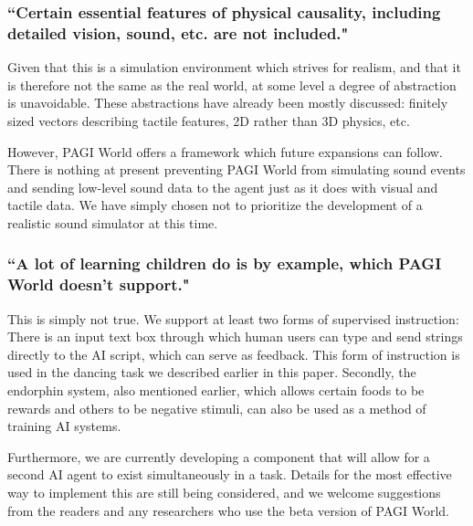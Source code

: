 
\subsubsection{``Certain essential features of physical causality, including detailed vision, sound, etc. are not included."}

Given that this is a simulation environment which strives for realism, and that it is therefore not the same as the real world, at some level a degree of abstraction is unavoidable. These abstractions have already been mostly discussed: finitely sized vectors describing tactile features, 2D rather than 3D physics, etc. 

However, PAGI World offers a framework which future expansions can follow. There is nothing at present preventing PAGI World from simulating sound events and sending low-level sound data to the agent just as it does with visual and tactile data. We have simply chosen not to prioritize the development of a realistic sound simulator at this time.

\subsubsection{``A lot of learning children do is by example, which PAGI World doesn't support."}

This is simply not true. We support at least two forms of supervised instruction: There is an input text box through which human users can type and send strings directly to the AI script, which can serve as feedback. This form of instruction is used in the dancing task we described earlier in this paper. Secondly, the endorphin system, also mentioned earlier, which allows certain foods to be rewards and others to be negative stimuli, can also be used as a method of training AI systems.

Furthermore, we are currently developing a component that will allow for a second AI agent to exist simultaneously in a task. Details for the most effective way to implement this are still being considered, and we welcome suggestions from the readers and any researchers who use the beta version of PAGI World.
